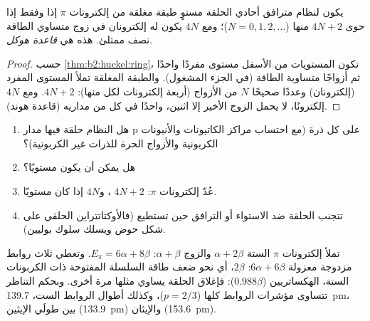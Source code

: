 \begin{theorem}\label{thm:b2:huckel:huckel-rule}
يكون لنظام مترافق أحادي الحلقة مستوٍ طبقة مغلقة من إلكترونات $\pi$ إذا وفقط
إذا حوى $4N + 2$ منها ($N = 0, 1, 2, \dots$)؛ ومع $4N$ يكون له إلكترونان في
زوج متساوي الطاقة نصف ممتلئ. هذه هي \emph{قاعدة هوكل}.
\end{theorem}

\begin{proof}
حسب \cref{thm:b2:huckel:ring}، تكون المستويات من الأسفل مستوى مفردًا واحدًا
ثم أزواجًا متساوية الطاقة (في الجزء المشغول). والطبقة المغلقة تملأ المستوى
المفرد (إلكترونان) وعددًا صحيحًا $N$ من الأزواج (أربعة إلكترونات لكل منها): $4N + 2$. ومع
$4N$ إلكترونًا، لا يحمل الزوج الأخير إلا اثنين، واحدًا في كل من مداريه (قاعدة
هوند).
\end{proof}

\begin{method}\label{met:b2:huckel:aromaticity}
\begin{enumerate}
  \item هل النظام حلقة فيها مدار p على كل ذرة (مع احتساب مراكز
        الكاتيونات والأنيونات الكربونية والأزواج الحرة للذرات غير الكربونية)؟
  \item هل يمكن أن يكون مستويًا؟
  \item عُدّ إلكترونات $\pi$: $4N + 2$ ، و$4N$  إذا كان مستويًا.
  \item تتجنب الحلقة ضد  الاستواء أو الترافق حين تستطيع
        (فالأوكتاتتراين الحلقي على شكل حوض ويسلك سلوك بوليين).
\end{enumerate}
\end{method}

\begin{example}[البنزين]\label{ex:b2:huckel:benzene}
تملأ إلكترونات $\pi$ الستة $\alpha + 2\beta$ والزوج $\alpha + \beta$: $E_\pi = 6\alpha + 8\beta$.
وتعطي ثلاث روابط مزدوجة معزولة $6\alpha + 6\beta$:  $2\beta$،
أي نحو ضعف طاقة السلسلة المفتوحة ذات الكربونات الستة، الهكساتريين ($0.988\beta$): فإغلاق
الحلقة يساوي مثلها مرة أخرى. وبحكم التناظر تتساوى مؤشرات الروابط كلها ($p = 2/3$)، وكذلك أطوال
الروابط الست، \qty{139.7}{pm}، بين طولَي الإيثين (\qty{133.9}{pm}) والإيثان
(\qty{153.6}{pm}).
\end{example}

